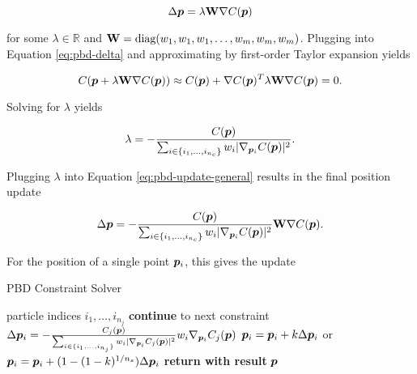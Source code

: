 \begin{equation}\label{eq:pbd-update-general}
    \Delta \bm{p} = \lambda \mathbf{W} \nabla C(\bm{p})
\end{equation}

\noindent for some $\lambda \in \mathbb{R}$ and $\mathbf{W} = \text{diag}(w_1, w_1, w_1, \ldots, w_m, w_m, w_m)$. 
Plugging into Equation \ref{eq:pbd-delta} and approximating by first-order Taylor expansion yields

\[
    C(\bm{p} + \lambda \mathbf{W} \nabla C(\bm{p})) \approx C(\bm{p}) + \nabla C(\bm{p})^T \lambda \mathbf{W}
    \nabla C(\bm{p}) = 0.
\]

\noindent Solving for $\lambda$ yields

\begin{equation}\label{eq:pbd-lambda}
    \lambda = -\frac{C(\bm{p})}{\sum_{i \in \{ i_1, \ldots, i_{n_c} \}} w_i \vert \nabla_{\bm{p}_i}C(\bm{p}) \vert^2 }.
\end{equation}

\noindent Plugging $\lambda$ into Equation \ref{eq:pbd-update-general} results in the final position update

\begin{equation}\label{eq:pbd-update}
    \Delta \bm{p} = -\frac{C(\bm{p})}{\sum_{i \in \{ i_1, \ldots, i_{n_c} \}} w_i \vert \nabla_{\bm{p}_i}C(\bm{p}) \vert^2 } 
    \mathbf{W}\nabla C(\bm{p}).
\end{equation}

\noindent For the position of a single point $\bm{p}_i$, this gives the update

\begin{algorithm}[H]
\caption{PBD Constraint Solver}\label{alg:pbd-solver}
\begin{algorithmic}[1]
\StatexIndent[3] particle indices $i_1, \ldots, i_{n_j}$ \algorithmicdo
{}
\State \textbf{continue} to next constraint
\EndIf
{}
\State $\Delta \bm{p}_i = -\frac{C_j(\bm{p})}{\sum_{i \in \{ i_1, \ldots, i_{n_j} \}} w_i \vert \nabla_{\bm{p}_i}
C_j(\bm{p}) \vert^2 } w_i \nabla_{\bm{p}_i} C_j(\bm{p})$
\State $\bm{p}_i = \bm{p}_i + k \Delta \bm{p}_i$ or $\bm{p}_i = \bm{p}_i + (1-(1-k)^{1/n_s}) \Delta \bm{p}_i$
\EndFor
\EndFor
\EndFor
\State \textbf{return with result } $\bm{p}$
\EndProcedure
\end{algorithmic}
\end{algorithm}

